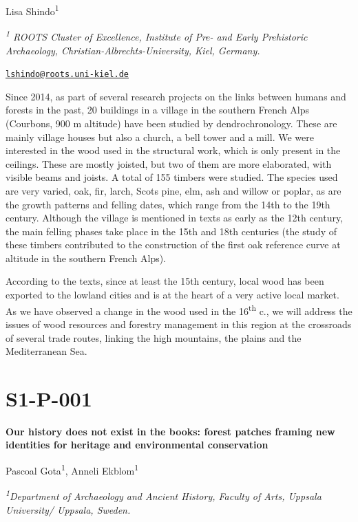 \documentclass[
]{book}
\begin{document}
Lisa Shindo\textsuperscript{1}

\emph{\textsuperscript{1} ROOTS Cluster of Excellence, Institute of Pre- and Early Prehistoric Archaeology, Christian-Albrechts-University, Kiel, Germany.}

\href{mailto:lshindo@roots.uni-kiel.de}{\nolinkurl{lshindo@roots.uni-kiel.de}}

Since 2014, as part of several research projects on the links between humans and forests in the past, 20 buildings in a village in the southern French Alps (Courbons, 900 m altitude) have been studied by dendrochronology. These are mainly village houses but also a church, a bell tower and a mill. We were interested in the wood used in the structural work, which is only present in the ceilings. These are mostly joisted, but two of them are more elaborated, with visible beams and joists. A total of 155 timbers were studied. The species used are very varied, oak, fir, larch, Scots pine, elm, ash and willow or poplar, as are the growth patterns and felling dates, which range from the 14th to the 19th century. Although the village is mentioned in texts as early as the 12th century, the main felling phases take place in the 15th and 18th centuries (the study of these timbers contributed to the construction of the first oak reference curve at altitude in the southern French Alps).

According to the texts, since at least the 15th century, local wood has been exported to the lowland cities and is at the heart of a very active local market. As we have observed a change in the wood used in the 16\textsuperscript{th} c., we will address the issues of wood resources and forestry management in this region at the crossroads of several trade routes, linking the high mountains, the plains and the Mediterranean Sea.

\hypertarget{s1-p-001}{%
\section*{S1-P-001}\label{s1-p-001}}

\textbf{Our history does not exist in the books: forest patches framing new identities for heritage and environmental conservation}

Pascoal Gota\textsuperscript{1}, Anneli Ekblom\textsuperscript{1}

\emph{\textsuperscript{1}Department of Archaeology and Ancient History, Faculty of Arts, Uppsala University/ Uppsala, Sweden.}
\end{document}
